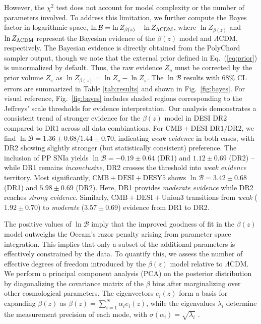 \documentclass[a4paper,11pt]{article}
\begin{document}
However, the $\chi^2$ test does not account for model complexity or the number of parameters involved. To address this limitation, we further compute the Bayes factor in logarithmic space, $\ln \mathcal{B} = \ln Z_{\beta(z)} - \ln Z_{\rm \Lambda CDM}$, where $\ln Z_{\beta(z)}$ and $\ln Z_{\rm \Lambda CDM}$ represent the Bayesian evidence of the $\beta(z)$ model and $\Lambda$CDM, respectively. The Bayesian evidence is directly obtained from the PolyChord sampler output, though we note that the external prior defined in Eq.~(\ref{eq:prior}) is unnormalized by default. Thus, the raw evidence $Z_{u}$ must be corrected by the prior volume $Z_{\pi}$ as $\ln Z_{\beta(z)}=\ln Z_{u} - \ln Z_{\pi}$. The $\ln \mathcal{B}$ results with 68\% CL errors are summarized in Table \ref{tab:results} and shown in Fig.~\ref{fig:bayes}. For visual reference, Fig.~\ref{fig:bayes} includes shaded regions corresponding to the Jeffreys' scale thresholds \cite{Kass:1995loi,Trotta:2008qt} for evidence interpretation. Our analysis demonstrates a consistent trend of stronger evidence for the $\beta(z)$ model in DESI DR2 compared to DR1 across all data combinations. For $\mathrm{CMB}+\mathrm{DESI}$ $\mathrm{DR1}/\mathrm{DR2}$, we find $\ln\mathcal{B} = 1.36\pm0.68/1.44\pm0.70$, indicating \textit{weak evidence} in both cases, with DR2 showing slightly stronger (but statistically consistent) preference. The inclusion of PP SNIa yields $\ln\mathcal{B} = -0.19\pm0.64$ (DR1) and $1.12\pm0.69$ (DR2) -- while DR1 remains \textit{inconclusive}, DR2 crosses the threshold into \textit{weak evidence} territory. Most significantly, $\mathrm{CMB}+\mathrm{DESI}+\mathrm{DESY5}$ shows $\ln\mathcal{B} = 3.42\pm0.68$ (DR1) and $5.98\pm0.69$ (DR2). Here, DR1 provides \textit{moderate evidence} while DR2 reaches \textit{strong evidence}. {Similarly, $\mathrm{CMB}+\mathrm{DESI}+\mathrm{Union3}$ transitions from \textit{weak} ($1.92\pm0.70$) to \textit{moderate} ($3.57\pm0.69$) evidence from DR1 to DR2.}



The positive values of $\ln \mathcal{B}$ imply that the improved goodness of fit in the $\beta(z)$ model outweighs the Occam's razor penalty arising from parameter space integration. This implies that only a subset of the additional parameters is effectively constrained by the data. To quantify this, we assess the number of effective degrees of freedom introduced by the $\beta(z)$ model relative to $\Lambda$CDM. We perform a principal component analysis (PCA) on the posterior distribution by diagonalizing the covariance matrix of the $\beta$ bins after marginalizing over other cosmological parameters. The eigenvectors $e_i(z)$ form a basis for expanding $\beta(z)$ as $\beta(z) = \sum_{i=1}^N \alpha_i e_i(z)$, while the eigenvalues $\lambda_i$ determine the measurement precision of each mode, with $\sigma(\alpha_i) = \sqrt{\lambda_i}$ \cite{Huterer:2002hy}. 
\end{document}
